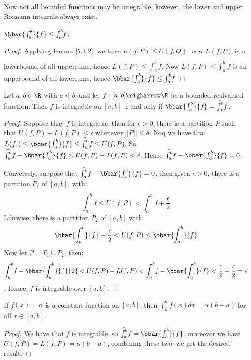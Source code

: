 Now not all bounded functions may be integrable, however, the lower and upper Riemann integrals always exist.

\begin{lemma}\label{1.5.4}
    $\bbar{\int_{a}^{b}}{f} \leq \bar{\int_{a}^{b}}{f}$.
\end{lemma}
\begin{proof} 		
    Applying lemma \ref{5.1.2}, we have $L(f,P) \leq U(f,Q)$, now  $L(f,P)$ is a lowerbound of all uppersums, hence  $L(f,P) \leq \bar{\int_{a}^{b}}{f}$.
    Now $L(f,P) \leq \bar{\int_{a}^{b}}{f}$ is an upperbound of all lowersums, hence $\bbar{\int_{a}^{b}}{f} \leq \bar{\int_{a}^{b}}{f}$
\end{proof}

\begin{theorem}\label{5.1.5}
    Let $a,b \in \R$ with  $a<b$, and let  $f:[a,b] \righarrow \R$ be a bounded realvalued function.
    Then  $f$ is integrable on  $[a,b]$ if and only if  $\bbar{\int_{a}^{b}}{f}=\bar{\int_{a}^{b}}{f}$.
\end{theorem}
\begin{proof}
    Suppose thay $f$ is integrable, then for  $\epsilon>0$, there is a partition  $P$ such that  $U(f,P)-L(f,P) \leq \epsilon$ whenever  $||P|| \leq \delta$.
    Noq we have that $L(f,) \leq \bbar{\int_{a}^{b}}{f} \leq \bar{\int_{a}^{b}}{f} \leq U(f,P)$.
    So  $\bar{\int_{a}^{b}}{f}-\bbar{\int_{a}^{b}}{f} \leq U(f,P)-L(f,P)<\epsilon$. Hence  $\bar{\int_{a}^{b}}{f}-\bbar{\int_{a}^{b}}{f}=0$.

    Conversely, suppose that $\bar{\int_{a}^{b}}{f}-\bbar{\int_{a}^{b}}{f}=0$, then given $\epsilon>0$, there is a partition  $P_1$ of  $[a,b]$, with:
        \begin{equation*}
             \bar{\int_{a}^{b}}{f} \leq U(f,P)<	\bar{\int_{a}^{b}}{f}+\frac{\epsilon}{2}
        \end{equation*}
Likewise, there is a partition $P_2$ of $[a,b]$ with:
        \begin{equation*}
            \bbar{\int_{a}^{b}}{f}-\frac{\epsilon}{2}<U(f,P) \leq \bbar{\int_{a}^{b}}{f}
        \end{equation*}
        Now let $P=P_1 \cup P_2$, then:
        \begin{equation*}
            \bar{\int_{a}^{b}}{f}-\bbar{\int_{a}^{b}}{f}{2}<U(f,P)-L(f,P)<\bar{\int_{a}^{b}}{f}-\bbar{\int_{a}^{b}}{f}<\frac{\epsilon}{2}+\frac{\epsilon}{2}=\epsilon
        \end{equation*}.
        Hence, $f$ is integrable over  $[a,b]$.
\end{proof}

\begin{theorem}\label{5.1.6}
    If $f(x)=\alpha$ is a constant function on  $[a,b]$, then  $\int_{a}^{b}{f(x) dx}=\alpha(b-a)$ for all  $x \in [a,b]$.
\end{theorem}
\begin{proof}
    We have that $f$ is integrable, so  $\bar{\int_{a}^{b}}{f}=\bbar{\int_{a}^{b}}{f}$, moreover we have  $U(f,P)=L(f,P)=\alpha(b-a)$, combining these two, we get the desired result.
\end{proof}
